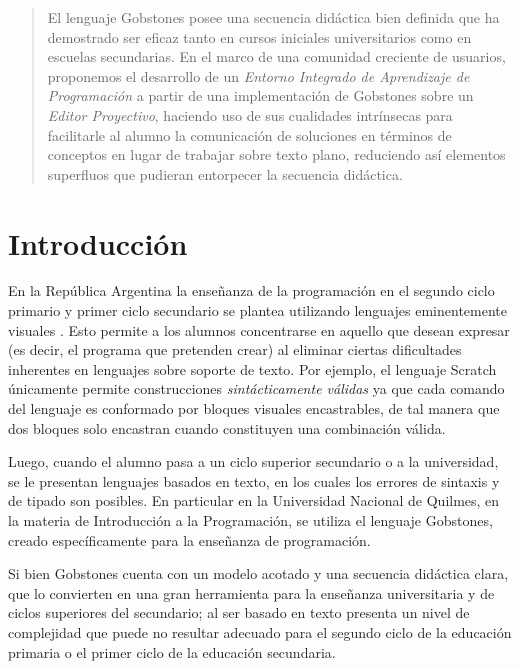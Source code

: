 \begin{abstract}
El lenguaje Gobstones posee una secuencia didáctica bien definida que ha demostrado ser eficaz tanto en cursos iniciales universitarios como en escuelas secundarias. En el marco de una comunidad creciente de usuarios, proponemos el desarrollo de un \textit{Entorno Integrado de Aprendizaje de Programación} a partir de una implementación de Gobstones sobre un \textit{Editor Proyectivo}, haciendo uso de sus cualidades intrínsecas para facilitarle al alumno la comunicación de soluciones en términos de conceptos en lugar de trabajar sobre texto plano, reduciendo así elementos superfluos que pudieran entorpecer la secuencia didáctica.
\end{abstract}



\section{Introducción}

En la República Argentina la enseñanza de la programación en el segundo ciclo primario y primer ciclo secundario se plantea utilizando lenguajes eminentemente visuales \cite{CuadernoDocenteProgramAR}. Esto permite a los alumnos concentrarse en aquello que desean expresar (es decir, el programa que pretenden crear) al eliminar ciertas dificultades inherentes en lenguajes sobre soporte de texto. Por ejemplo, el lenguaje Scratch\cite{scratch}\cite{Maloney_scratch} únicamente permite construcciones \textit{sintácticamente válidas} ya que cada comando del lenguaje es conformado por bloques visuales encastrables, de tal manera que dos bloques solo encastran cuando constituyen una combinación válida.

Luego, cuando el alumno pasa a un ciclo superior secundario o a la universidad, se le presentan lenguajes basados en texto, en los cuales los errores de sintaxis y de tipado son posibles. En particular en la Universidad Nacional de Quilmes, en la materia de Introducción a la Programación, se utiliza el lenguaje Gobstones\cite{Gobstones}, creado específicamente para la enseñanza de programación.

Si bien Gobstones cuenta con un modelo acotado y una secuencia didáctica clara, que lo convierten en una gran herramienta para la enseñanza universitaria y de ciclos superiores del secundario; al ser basado en texto presenta un nivel de complejidad que puede no resultar adecuado para el segundo ciclo de la educación primaria o el primer ciclo de la educación secundaria.

